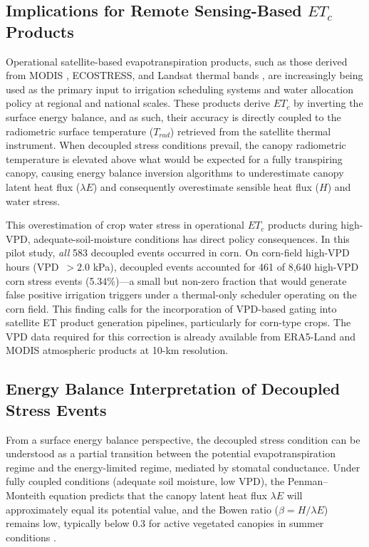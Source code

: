\documentclass[review,12pt]{elsarticle}
\begin{document}
\subsection{Implications for Remote Sensing-Based $ET_c$ Products}
\label{subsec:remote_sensing_implications}

Operational satellite-based evapotranspiration products, such as those derived from MODIS \citep{gao2020mapping}, ECOSTRESS, and Landsat thermal bands \citep{anderson2011usability}, are increasingly being used as the primary input to irrigation scheduling systems and water allocation policy at regional and national scales. These products derive $ET_c$ by inverting the surface energy balance, and as such, their accuracy is directly coupled to the radiometric surface temperature ($T_{rad}$) retrieved from the satellite thermal instrument. When decoupled stress conditions prevail, the canopy radiometric temperature is elevated above what would be expected for a fully transpiring canopy, causing energy balance inversion algorithms to underestimate canopy latent heat flux ($\lambda E$) and consequently overestimate sensible heat flux ($H$) and water stress.

This overestimation of crop water stress in operational $ET_c$ products during high-VPD, adequate-soil-moisture conditions has direct policy consequences. In this pilot study, \textit{all} 583 decoupled events occurred in corn. On corn-field high-VPD hours (VPD~$> 2.0$ kPa), decoupled events accounted for 461 of 8,640 high-VPD corn stress events (5.34\%)---a small but non-zero fraction that would generate false positive irrigation triggers under a thermal-only scheduler operating on the corn field. This finding calls for the incorporation of VPD-based gating into satellite ET product generation pipelines, particularly for corn-type crops. The VPD data required for this correction is already available from ERA5-Land and MODIS atmospheric products at 10-km resolution.

\subsection{Energy Balance Interpretation of Decoupled Stress Events}
\label{subsec:energy_balance}

From a surface energy balance perspective, the decoupled stress condition can be understood as a partial transition between the potential evapotranspiration regime and the energy-limited regime, mediated by stomatal conductance. Under fully coupled conditions (adequate soil moisture, low VPD), the Penman--Monteith equation predicts that the canopy latent heat flux $\lambda E$ will approximately equal its potential value, and the Bowen ratio ($\beta = H / \lambda E$) remains low, typically below 0.3 for active vegetated canopies in summer conditions \citep{katul2012evapotranspiration}.
\end{document}
